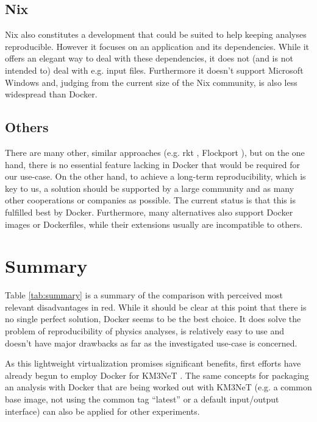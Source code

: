 \documentclass[a4paper, twoside, 11pt]{article}
\begin{document}
\subsection{Nix}
Nix \cite{nix:about} also constitutes a development that could be suited to help keeping analyses reproducible. 
However it focuses on an application and its dependencies. 
While it offers an elegant way to deal with these dependencies, it does not (and is not intended to) deal with e.g. input files. 
Furthermore it doesn't support Microsoft Windows and, 
judging from the current size of the Nix community, is also less widespread than Docker. 


\subsection{Others}
There are many other, similar approaches 
(e.g. rkt \cite{rkt:about}, Flockport \cite{flockport:about}), 
but on the one hand, there is no essential feature lacking in Docker that would be required 
for our use-case. 
On the other hand, to achieve a long-term reproducibility, which is key to us, 
a solution should be supported by a large community and as many other cooperations or companies as possible. 
The current status is that this is fulfilled best by Docker. 
Furthermore, many alternatives also support Docker images or Dockerfiles, while their extensions usually are incompatible to others. 


\section{Summary}

Table \ref{tab:summary} is a summary of the comparison with perceived most relevant disadvantages in red.  
While it should be clear at this point that there is no single perfect solution, 
Docker seems to be the best choice. It does solve the problem of reproducibility of physics analyses, 
is relatively easy to use \cite{km3net:howdocker} 
and doesn't have major drawbacks as far as the investigated use-case is concerned. 

As this lightweight virtualization promises significant benefits, 
first efforts have already begun to employ Docker for KM3NeT \cite{github:dockerprojects}. 
The same concepts for packaging an analysis with Docker that are being worked out with KM3NeT 
(e.g. a common base image, not using the common tag ``latest'' or a default input/output interface) 
can also be applied for other experiments.
\end{document}
